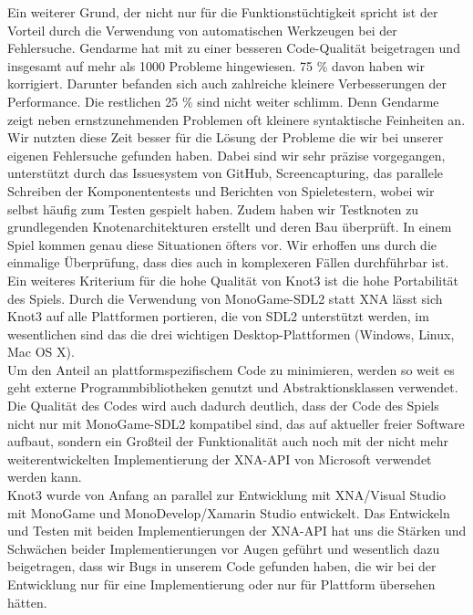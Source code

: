 Ein weiterer Grund, der nicht nur für die Funktionstüchtigkeit spricht ist der Vorteil durch die Verwendung von automatischen Werkzeugen bei der Fehlersuche. Gendarme hat mit zu einer besseren Code-Qualität beigetragen und insgesamt auf mehr als 1000 Probleme hingewiesen. 75 \% davon haben wir korrigiert. Darunter befanden sich auch zahlreiche kleinere Verbesserungen der Performance. Die restlichen 25 \% sind nicht weiter schlimm. Denn Gendarme zeigt neben ernstzunehmenden Problemen oft kleinere syntaktische Feinheiten an. Wir nutzten diese Zeit besser für die Lösung der Probleme die wir bei unserer eigenen Fehlersuche gefunden haben. Dabei sind wir sehr präzise vorgegangen, unterstützt durch das Issuesystem von GitHub, Screencapturing, das parallele Schreiben der Komponententests und Berichten von Spieletestern, wobei wir selbst häufig zum Testen gespielt haben. Zudem haben wir Testknoten zu grundlegenden Knotenarchitekturen erstellt und deren Bau überprüft. In einem Spiel kommen genau diese Situationen öfters vor. Wir erhoffen uns durch die einmalige Überprüfung, dass dies auch in komplexeren Fällen durchführbar ist. \\

Ein weiteres Kriterium für die hohe Qualität von Knot3 ist die hohe Portabilität des Spiels. Durch die Verwendung von MonoGame-SDL2 statt XNA lässt sich Knot3 auf alle Plattformen portieren, die von SDL2 unterstützt werden, im wesentlichen sind das die drei wichtigen Desktop-Plattformen (Windows, Linux, Mac OS X).\\

Um den Anteil an plattformspezifischem Code zu minimieren, werden so weit es geht externe Programmbibliotheken genutzt und Abstraktionsklassen verwendet. Die Qualität des Codes wird auch dadurch deutlich, dass der Code des Spiels nicht nur mit MonoGame-SDL2 kompatibel sind, das auf aktueller freier Software aufbaut, sondern ein Großteil der Funktionalität auch noch mit der nicht mehr weiterentwickelten Implementierung der XNA-API von Microsoft verwendet werden kann.\\

Knot3 wurde von Anfang an parallel zur Entwicklung mit XNA/Visual Studio mit MonoGame und MonoDevelop/Xamarin Studio entwickelt. Das Entwickeln und Testen mit beiden Implementierungen der XNA-API hat uns die Stärken und Schwächen beider Implementierungen vor Augen geführt und wesentlich dazu beigetragen, dass wir Bugs in unserem Code gefunden haben, die wir bei der Entwicklung nur für eine Implementierung oder nur für Plattform übersehen hätten.\\

